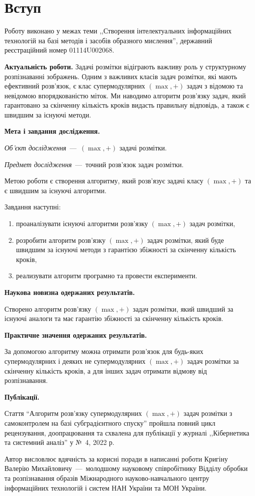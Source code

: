\chapter*{Вступ}

Роботу виконано у межах теми ,,Створення інтелектуальних інформаційних
технологій на базі методів і засобів образного мислення'',
державний реєстраційний номер 01114U002068.

\textbf{Актуальність роботи.}
Задачі розмітки відіграють важливу роль у структурному розпізнаванні
зображень. Одним з важливих класів задач
розмітки, які мають ефективний розв’язок, є клас супермодулярних
\((\max,+)\) задач з відомою  та невідомою впорядкованістю міток.
Ми наводимо алгоритм розв'язку задач, який гарантовано за скінченну кількість
кроків видасть правильну відповідь, а також є швидшим за існуючі методи.

\textbf{Мета і завдання дослідження.}

\textit{Об'єкт дослідження}~---~\((\max,+)\) задачі розмітки.

\textit{Предмет дослідження}~---~точний розв’язок задач розмітки.

Метою роботи є створення алгоритму, який розв'язує задачі класу
\((\max,+)\) та є швидшим за існуючі алгоритми.

Завдання наступні:
\begin{enumerate}
  \item
    проаналізувати існуючі алгоритми розв'язку \((\max,+)\) задач розмітки,
  \item
    розробити алгоритм розв'язку \((\max,+)\) задач розмітки, який буде
    швидшим за існуючі методи з гарантією збіжності за скінченну
    кількість кроків,
  \item
    реализувати алгоритм програмно та провести експерименти.
\end{enumerate}

\textbf{Наукова новизна одержаних результатів.}

Створено алгоритм розв'язку \((\max,+)\) задач розмітки, який швидший за
існуючі аналоги та має гарантію збіжності за скінченну кількість кроків.

\textbf{Практичне значення одержаних результатів.}

За допомогою алгоритму можна отримати розв'язок для будь-яких
супермодулярних і деяких не супермодулярних \((\max,+)\) задач розмітки
за скінченну кількість кроків,
а для інших задач отримати відмову від розпізнавання.

\textbf{Публікації.}

Стаття ``Алгоритм розв'язку супермодулярних $(\max, +)$ задач
розмітки з самоконтролем на базі субградієнтного спуску''
пройшла повний цикл рецензування, доопрацювання та схвалена для
публікації у журналі
,,Кібернетика та системний аналіз'' у № 4, 2022 р.

Автор висловлює вдячність за корисні поради в написанні роботи Кригіну Валерію Михайловичу~---~молодшому
науковому співробітнику Відділу обробки та розпізнавання
образів Міжнародного науково-навчального центру інформаційних
технологій і систем НАН України та МОН України.